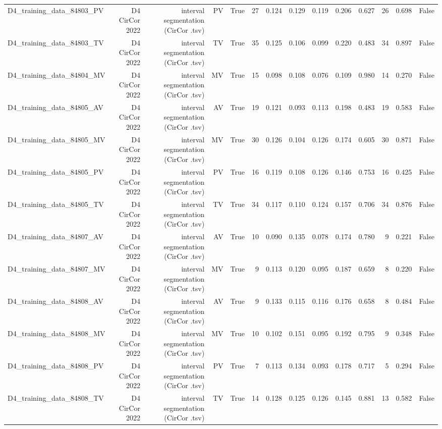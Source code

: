 \begin{table}[htbp]
\begin{tabular}{lrrrrrrrrrrrrr}
    D4\_training\_data\_84803\_PV & D4 CirCor 2022 & interval segmentation (CirCor .tsv) & PV & True & 27 & 0.124 & 0.129 & 0.119 & 0.206 & 0.627 & 26 & 0.698 & False \\
    D4\_training\_data\_84803\_TV & D4 CirCor 2022 & interval segmentation (CirCor .tsv) & TV & True & 35 & 0.125 & 0.106 & 0.099 & 0.220 & 0.483 & 34 & 0.897 & False \\
    D4\_training\_data\_84804\_MV & D4 CirCor 2022 & interval segmentation (CirCor .tsv) & MV & True & 15 & 0.098 & 0.108 & 0.076 & 0.109 & 0.980 & 14 & 0.270 & False \\
    D4\_training\_data\_84805\_AV & D4 CirCor 2022 & interval segmentation (CirCor .tsv) & AV & True & 19 & 0.121 & 0.093 & 0.113 & 0.198 & 0.483 & 19 & 0.583 & False \\
    D4\_training\_data\_84805\_MV & D4 CirCor 2022 & interval segmentation (CirCor .tsv) & MV & True & 30 & 0.126 & 0.104 & 0.126 & 0.174 & 0.605 & 30 & 0.871 & False \\
    D4\_training\_data\_84805\_PV & D4 CirCor 2022 & interval segmentation (CirCor .tsv) & PV & True & 16 & 0.119 & 0.108 & 0.126 & 0.146 & 0.753 & 16 & 0.425 & False \\
    D4\_training\_data\_84805\_TV & D4 CirCor 2022 & interval segmentation (CirCor .tsv) & TV & True & 34 & 0.117 & 0.110 & 0.124 & 0.157 & 0.706 & 34 & 0.876 & False \\
    D4\_training\_data\_84807\_AV & D4 CirCor 2022 & interval segmentation (CirCor .tsv) & AV & True & 10 & 0.090 & 0.135 & 0.078 & 0.174 & 0.780 & 9 & 0.221 & False \\
    D4\_training\_data\_84807\_MV & D4 CirCor 2022 & interval segmentation (CirCor .tsv) & MV & True & 9 & 0.113 & 0.120 & 0.095 & 0.187 & 0.659 & 8 & 0.220 & False \\
    D4\_training\_data\_84808\_AV & D4 CirCor 2022 & interval segmentation (CirCor .tsv) & AV & True & 9 & 0.133 & 0.115 & 0.116 & 0.176 & 0.658 & 8 & 0.484 & False \\
    D4\_training\_data\_84808\_MV & D4 CirCor 2022 & interval segmentation (CirCor .tsv) & MV & True & 10 & 0.102 & 0.151 & 0.095 & 0.192 & 0.795 & 9 & 0.348 & False \\
    D4\_training\_data\_84808\_PV & D4 CirCor 2022 & interval segmentation (CirCor .tsv) & PV & True & 7 & 0.113 & 0.134 & 0.093 & 0.178 & 0.717 & 5 & 0.294 & False \\
    D4\_training\_data\_84808\_TV & D4 CirCor 2022 & interval segmentation (CirCor .tsv) & TV & True & 14 & 0.128 & 0.125 & 0.126 & 0.145 & 0.881 & 13 & 0.582 & False \\

\end{tabular}
\end{table}
